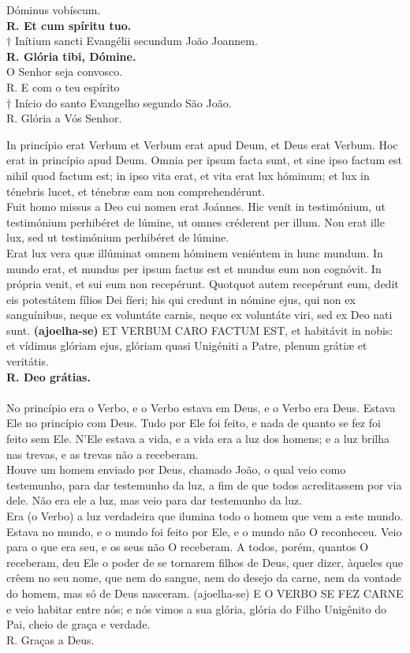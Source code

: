 \begin{multicols}{2}
	\noindent Dóminus vobíscum.
	\\ \textbf{R. Et cum spíritu tuo.}
	\\  $\dagger$ Inítium sancti Evangélii secundum
	João Joannem.
	\\ \textbf{R. Glória tibi, Dómine.}
	\\O Senhor seja convosco.
	\\R. E com o teu espírito
	\\ $\dagger$ Início do santo Evangelho segundo São João.
	\\ R. Glória a Vós Senhor.
\end{multicols}

\begin{multicols}{2}
\noindent In princípio erat Verbum et Verbum erat apud Deum, et Deus erat Verbum. Hoc erat in princípio apud Deum. Omnia per ipsum facta sunt, et sine ipso factum est nihil quod factum est; in ipso vita erat, et vita erat lux hóminum; et lux in ténebris lucet, et ténebræ eam non comprehendérunt. 
\\ Fuit homo missus a Deo cui nomen erat Joánnes. Hic venit in testimónium, ut testimónium perhibéret de lúmine, ut omnes créderent per illum. Non erat ille lux, sed ut testimónium perhibéret de lúmine. 
\\Erat lux vera quæ illúminat omnem hóminem veniéntem in hunc mundum. In mundo erat, et mundus per ipsum factus est et mundus eum non cognóvit. In própria venit, et sui eum non recepérunt. Quotquot autem recepérunt eum, dedit eis potestátem fílios Dei fíeri; his qui credunt in nómine ejus, qui non ex sanguínibus, neque ex voluntáte carnis, neque ex voluntáte viri, sed ex Deo nati sunt. \textbf{(ajoelha-se)} ET VERBUM CARO FACTUM EST, et habitávit in nobis: et vídimus glóriam ejus, glóriam quasi Unigéniti a Patre, plenum grátiæ et veritátis.
\\ \textbf{R. Deo grátias.} 
\\
\\ No princípio era o Verbo, e o Verbo estava em Deus, e o Verbo era Deus. Estava Ele no princípio com Deus. Tudo por Ele foi feito, e nada de quanto se fez foi feito sem Ele. N’Ele estava a vida, e a vida era a luz dos homens; e a luz brilha nas trevas, e as trevas não a receberam. 
\\Houve um homem enviado por Deus, chamado João, o qual veio como testemunho, para dar testemunho da luz, a fim de que todos acreditassem por via dele. Não era ele a luz, mas veio para dar testemunho da luz. 
\\ Era (o Verbo) a luz verdadeira que ilumina todo o homem que vem a este mundo. Estava no mundo, e o mundo foi feito por Ele, e o mundo não O reconheceu. Veio para o que era seu, e os seus não O receberam. A todos, porém, quantos O receberam, deu Ele o poder de se tornarem filhos de Deus, quer dizer, àqueles que crêem no seu nome, que nem do sangue, nem do desejo da carne, nem da vontade do homem, mas só de Deus nasceram. (ajoelha-se) E O VERBO SE FEZ CARNE e veio habitar entre nós; e nós vimos a sua glória, glória do Filho Unigênito do Pai, cheio de graça e verdade.
\\R. Graças a Deus.

\end{multicols}
